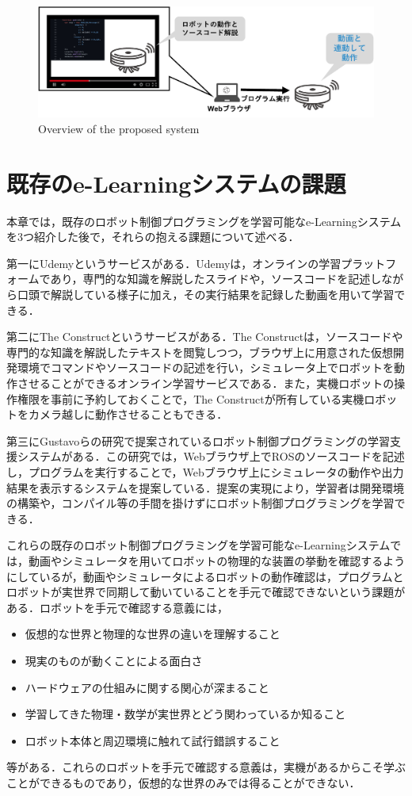 \documentclass{ujarticle}
\begin{document}
\begin{figure}[t]
  \centering
  \includegraphics[keepaspectratio, scale=0.3]{./src/Proposal_system_ab.pdf}
  \caption{Overview of the proposed system}
  \label{fig:Proposal_system_ab}
\end{figure}

\section{既存のe-Learningシステムの課題}
本章では，既存のロボット制御プログラミングを学習可能なe-Learningシステムを3つ紹介した後で，それらの抱える課題について述べる．
\par 第一にUdemy\cite{Udemy}というサービスがある．Udemyは，オンラインの学習プラットフォームであり，専門的な知識を解説したスライドや，ソースコードを記述しながら口頭で解説している様子に加え，その実行結果を記録した動画を用いて学習できる．
\par 第二にThe Construct\cite{Construct}というサービスがある．The Constructは，ソースコードや専門的な知識を解説したテキストを閲覧しつつ，ブラウザ上に用意された仮想開発環境でコマンドやソースコードの記述を行い，シミュレータ上でロボットを動作させることができるオンライン学習サービスである．また，実機ロボットの操作権限を事前に予約しておくことで，The Constructが所有している実機ロボットをカメラ越しに動作させることもできる．
\par 第三にGustavoらの研究で提案されているロボット制御プログラミングの学習支援システム\cite{Gustavo}がある．この研究では，Webブラウザ上でROSのソースコードを記述し，プログラムを実行することで，Webブラウザ上にシミュレータの動作や出力結果を表示するシステムを提案している．提案の実現により，学習者は開発環境の構築や，コンパイル等の手間を掛けずにロボット制御プログラミングを学習できる．
\par これらの既存のロボット制御プログラミングを学習可能なe-Learningシステムでは，動画やシミュレータを用いてロボットの物理的な装置の挙動を確認するようにしているが，動画やシミュレータによるロボットの動作確認は，プログラムとロボットが実世界で同期して動いていることを手元で確認できないという課題がある．ロボットを手元で確認する意義には，
\begin{itemize}
  \item 仮想的な世界と物理的な世界の違いを理解すること
  \item 現実のものが動くことによる面白さ
  \item ハードウェアの仕組みに関する関心が深まること
  \item 学習してきた物理・数学が実世界とどう関わっているか知ること
  \item ロボット本体と周辺環境に触れて試行錯誤すること
\end{itemize}
等がある．これらのロボットを手元で確認する意義は，実機があるからこそ学ぶことができるものであり，仮想的な世界のみでは得ることができない．
\end{document}
